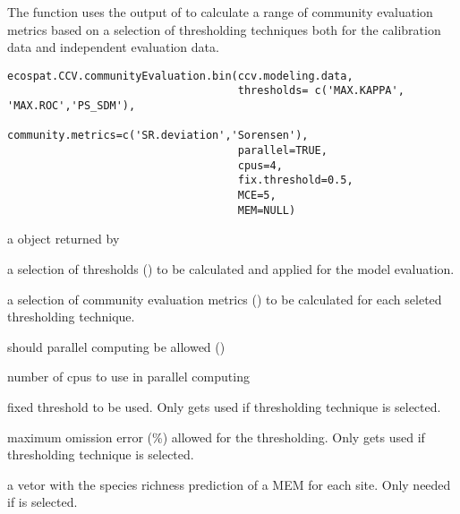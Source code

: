 \documentclass[a4paper]{book}
\begin{document}
%
\begin{Description}\relax
The function uses the output of  to calculate a range of community evaluation metrics based on a selection of thresholding techniques both for the calibration data and independent evaluation data.
\end{Description}
%
\begin{Usage}
\begin{verbatim}
ecospat.CCV.communityEvaluation.bin(ccv.modeling.data,
                                    thresholds= c('MAX.KAPPA', 'MAX.ROC','PS_SDM'),
                                    community.metrics=c('SR.deviation','Sorensen'),
                                    parallel=TRUE,
                                    cpus=4,
                                    fix.threshold=0.5,
                                    MCE=5,
                                    MEM=NULL)
\end{verbatim}
\end{Usage}
%
\begin{Arguments}
\begin{ldescription}
\item[\code{ccv.modeling.data}] a  object returned by 
\item[\code{thresholds}] a selection of thresholds () to be calculated and applied for the model evaluation.
\item[\code{community.metrics}] a selection of community evaluation metrics () to be calculated for each seleted thresholding technique.
\item[\code{parallel}] should parallel computing be allowed ()
\item[\code{cpus}] number of cpus to use in parallel computing
\item[\code{fix.threshold}] fixed threshold to be used. Only gets used if thresholding technique  is selected.
\item[\code{MCE}] maximum omission error (\%) allowed for the thresholding. Only gets used if thresholding technique  is selected.
\item[\code{MEM}] a vetor with the species richness prediction of a MEM for each site. Only needed if  is selected.

\end{ldescription}
\end{Arguments}
\end{document}
